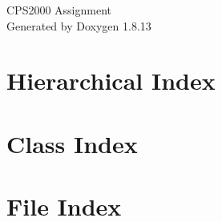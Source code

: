 \documentclass[twoside]{book}
\newcommand{\+}{\discretionary{\mbox{\scriptsize$\hookleftarrow$}}{}{}}
\newcommand{\clearemptydoublepage}{%
  \newpage{\pagestyle{empty}\cleardoublepage}%
}
\begin{document}
\hypersetup{pageanchor=false,
             bookmarksnumbered=true,
             pdfencoding=unicode
            }
\begin{titlepage}
\vspace*{7cm}
\begin{center}%
{\Large C\+P\+S2000 Assignment }\\
\vspace*{1cm}
{\large Generated by Doxygen 1.8.13}\\
\end{center}
\end{titlepage}
\clearemptydoublepage
{}
\tableofcontents
\clearemptydoublepage
{}
\hypersetup{pageanchor=true}

\chapter{Hierarchical Index}

\chapter{Class Index}

\chapter{File Index}

\end{document}
